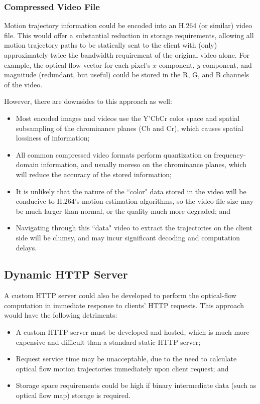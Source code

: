 \subsubsection{Compressed Video File}
Motion trajectory information could be encoded into an H.264 (or similar) video file. This would offer a substantial reduction in storage requirements, allowing all motion trajectory paths to be statically sent to the client with (only) approximately twice the bandwidth requirement of the original video alone. For example, the optical flow vector for each pixel's $x$ component, $y$ component, and magnitude (redundant, but useful) could be stored in the R, G, and B channels of the video.
\par However, there are downsides to this approach as well:\cite{h264}
\begin{itemize}
    \item Most encoded images and videos use the Y'CbCr color space and spatial subsampling of the chrominance planes (Cb and Cr), which causes spatial lossiness of information;
    \item All common compressed video formats perform quantization on frequency-domain information, and usually moreso on the chrominance planes, which will reduce the accuracy of the stored information;
    \item It is unlikely that the nature of the ``color" data stored in the video will be conducive to H.264's motion estimation algorithms, so the video file size may be much larger than normal, or the quality much more degraded; and
    \item Navigating through this ``data" video to extract the trajectories on the client side will be clumsy, and may incur significant decoding and computation delays.
\end{itemize}

\subsection{Dynamic HTTP Server}
A custom HTTP server could also be developed to perform the optical-flow computation in immediate response to clients' HTTP requests.\cite{dynamicweb} This approach would have the following detriments:
\begin{itemize}
    \item A custom HTTP server must be developed and hosted, which is much more expensive and difficult than a standard static HTTP server;
    \item Request service time may be unacceptable, due to the need to calculate optical flow motion trajectories immediately upon client request; and
    \item Storage space requirements could be high if binary intermediate data (such as optical flow map) storage is required.
\end{itemize}

